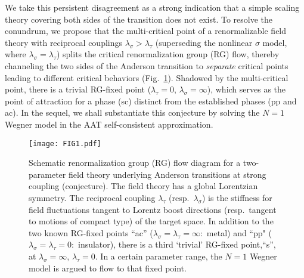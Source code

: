 \documentclass[aps,prl,twocolumn,letterpaper,superscriptaddress]{revtex4-2}
\begin{document}
We take this persistent disagreement as a strong indication that a simple scaling theory covering both sides of the transition does not exist. To resolve the conundrum, we propose that the multi-critical point of a renormalizable field theory with reciprocal couplings $\lambda_\sigma > \lambda_\tau$ (superseding the nonlinear $\sigma$ model, where $\lambda_\sigma = \lambda_\tau$) splits the critical renormalization group (RG) flow, thereby channeling the two sides of the Anderson transition to \emph{separate} critical points leading to different critical behaviors (Fig.\ \ref{fig:F1}). Shadowed by the multi-critical point, there is a trivial RG-fixed point ($\lambda_\tau = 0$, $\lambda_\sigma = \infty$), which serves as the point of attraction for a phase (sc) distinct from the established phases (pp and ac). In the sequel, we shall substantiate this conjecture by solving the $N=1$ Wegner model in the AAT self-consistent approximation.
\begin{figure}
    \centering
    \texttt{[image: FIG1.pdf]}
    \caption{Schematic renormalization group (RG) flow diagram for a two-parameter field theory underlying Anderson transitions at strong coupling (conjecture). The field theory has a global Lorentzian symmetry. The reciprocal coupling $\lambda_\tau$ (resp.\ $\lambda_\sigma$) is the stiffness for field fluctuations tangent to Lorentz boost directions (resp.\ tangent to motions of compact type) of the target space. In addition to the two known RG-fixed points ``ac'' ($\lambda_\sigma = \lambda_\tau = \infty:$ metal) and ``pp" ($\lambda_\sigma = \lambda_\tau = 0:$ insulator), there is a third `trivial' RG-fixed point,``s'', at $\lambda_\sigma = \infty$, $\lambda_\tau = 0$. In a certain parameter range, the $N=1$ Wegner model is argued to flow to that fixed point.} \label{fig:F1}
\end{figure}
\end{document}
